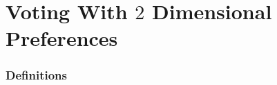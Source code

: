 \documentclass[12pt]{article}
\newcommand{\1}[1]{\mathds{1}[{#1}]}
\begin{document}














\clearpage
\part{Voting With $2$ Dimensional Preferences}

\section{Definitions}
\end{document}
